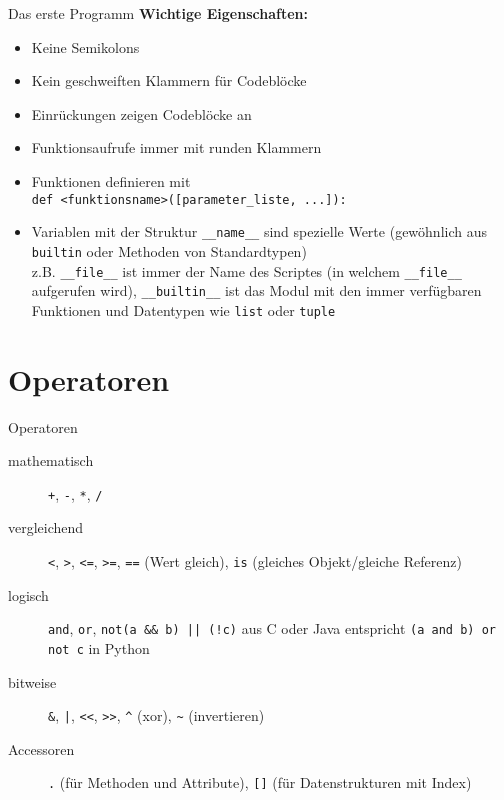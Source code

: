 \begin{frame}[fragile]{Das erste Programm}
	\textbf{Wichtige Eigenschaften:}
	\begin{itemize}
	    \item Keine Semikolons
	    \item Kein geschweiften Klammern für Codeblöcke
	    \item Einrückungen zeigen Codeblöcke an
	    \item Funktionsaufrufe immer mit runden Klammern
	    \item Funktionen definieren mit \\
	   		  \alert{\texttt{def <funktionsname>([parameter\_liste, ...]):}}
	    \item Variablen mit der Struktur \alert{\texttt{\_\_name\_\_}} sind spezielle Werte (gewöhnlich aus \alert{\texttt{builtin}} oder Methoden von Standardtypen)\\
	      z.B. \alert{\texttt{\_\_file\_\_}} ist immer der Name des Scriptes (in welchem \alert{\texttt{\_\_file\_\_}} aufgerufen wird),
	      \alert{\texttt{\_\_builtin\_\_}} ist das Modul mit den immer verfügbaren Funktionen und Datentypen wie \alert{\texttt{list}} oder \alert{\texttt{tuple}}
	\end{itemize}
\end{frame}


\section{Operatoren}
\begin{frame}[fragile]{Operatoren}
	\begin{description}
	    \item[mathematisch] \alert{\texttt{+}}, \alert{\texttt{-}}, \alert{\texttt{*}}, \alert{\texttt{/}}
	    \item[vergleichend] \alert{\texttt{<}}, \alert{\texttt{>}}, \alert{\texttt{<=}}, \alert{\texttt{>=}}, \alert{\texttt{==}} (Wert gleich), \alert{\texttt{is}} (gleiches Objekt/gleiche Referenz)
	    \item[logisch] \alert{\texttt{and}}, \alert{\texttt{or}}, \alert{\texttt{not}}\alert{\texttt{(a \&\& b) || (!c)}} aus C oder Java entspricht \alert{\texttt{(a and b) or not c}} in Python
	    \item[bitweise] \alert{\texttt{\&}}, \alert{\texttt{|}}, \alert{\texttt{<<}}, \alert{\texttt{>>}}, \alert{\texttt{\^}} (xor), \alert{\texttt{\~}} (invertieren)
	    \item[Accessoren] \alert{\texttt{.}} (für Methoden und Attribute), \alert{\texttt{[]}} (für Datenstrukturen mit Index)
	\end{description}
\end{frame}


